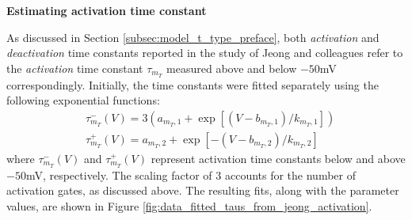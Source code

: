 \documentclass[../main.tex]{subfiles}
\begin{document}
\vspace*{0.3cm}
\noindent\textbf{Estimating activation time constant}

As discussed in Section \ref{subsec:model_t_type_preface}, both \textit{activation} and \textit{deactivation} time constants reported in the study of Jeong and colleagues refer to the \textit{activation} time constant $\tau_{m_T}$ measured above and below $-50$mV correspondingly. Initially, the time constants were fitted separately using the following exponential functions:
\begin{align}
    & \tau_{m_T}^-(V) = 3(a_{m_T,1} + \exp{[(V - b_{m_T,1})/k_{m_T,1}]}) \label{eq_model_r5_t_type_tau_m_discontinuous_below}\\
    & \tau_{m_T}^+(V) = a_{m_T,2} + \exp{[-(V - b_{m_T,2})/k_{m_T,2}]} \label{eq_model_r5_t_type_tau_m_discontinuous_above}
\end{align}
where $\tau_{m_T}^-(V)$ and $\tau_{m_T}^+(V)$ represent activation time constants below and above $-50$mV, respectively. The scaling factor of $3$ accounts for the number of activation gates, as discussed above. The resulting fits, along with the parameter values, are shown in Figure \ref{fig:data_fitted_taus_from_jeong_activation}.
\end{document}
